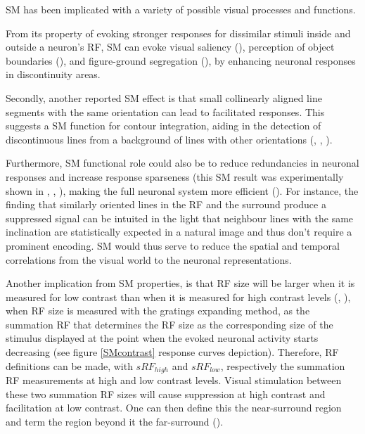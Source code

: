 SM has been implicated with a variety of possible visual processes and functions.

From its property of evoking stronger responses for dissimilar stimuli inside and outside a neuron's RF, SM can evoke visual saliency (\cite{Knierim1992}), perception of object boundaries (\cite{Nothdurft2000}), and figure-ground segregation (\cite{Lamme1995}), by enhancing neuronal responses in discontinuity areas.

Secondly, another reported SM effect is that small collinearly aligned line segments with the same orientation can lead to facilitated responses. This suggests a SM function for contour integration, aiding in the detection of discontinuous lines from a background of lines with other orientations (\cite{Kapadia1995}, \cite{Polat1998}, \cite{Field2013}).

Furthermore, SM functional role could also be to reduce redundancies in neuronal responses and increase response sparseness (this SM result was experimentally shown in \cite{Vinje2000}, \cite{Wolf2014}, \cite{Pecka2014}), making the full neuronal system more efficient (\cite{Barlow1961}). For instance, the finding that similarly oriented lines in the RF and the surround produce a suppressed signal can be intuited in the light that neighbour lines with the same inclination are statistically expected in a natural image and thus don't require a prominent encoding. SM would thus serve to reduce the spatial and temporal correlations from the visual world to the neuronal representations.

Another implication from SM properties, is that RF size will be larger when it is measured for low contrast than when it is measured for high contrast levels (\cite{Sengpiel1997}, \cite{Sceniak1999}), when RF size is measured with the gratings expanding method, as the summation RF that determines the RF size as the corresponding size of the stimulus displayed at the point when the evoked neuronal activity starts decreasing (see figure \ref{SMcontrast} response curves depiction). Therefore, RF definitions can be made, with $sRF_{high}$ and $sRF_{low}$, respectively the summation RF measurements at high and low contrast levels. Visual stimulation between these two summation RF sizes will cause suppression at high contrast and facilitation at low contrast. One can then define this the near-surround region and term the region beyond it the far-surround (\cite{Angelucci2017}).

